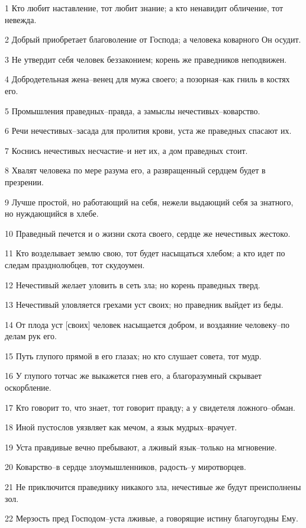 \par 1 Кто любит наставление, тот любит знание; а кто ненавидит обличение, тот невежда.
\par 2 Добрый приобретает благоволение от Господа; а человека коварного Он осудит.
\par 3 Не утвердит себя человек беззаконием; корень же праведников неподвижен.
\par 4 Добродетельная жена--венец для мужа своего; а позорная--как гниль в костях его.
\par 5 Промышления праведных--правда, а замыслы нечестивых--коварство.
\par 6 Речи нечестивых--засада для пролития крови, уста же праведных спасают их.
\par 7 Коснись нечестивых несчастие--и нет их, а дом праведных стоит.
\par 8 Хвалят человека по мере разума его, а развращенный сердцем будет в презрении.
\par 9 Лучше простой, но работающий на себя, нежели выдающий себя за знатного, но нуждающийся в хлебе.
\par 10 Праведный печется и о жизни скота своего, сердце же нечестивых жестоко.
\par 11 Кто возделывает землю свою, тот будет насыщаться хлебом; а кто идет по следам празднолюбцев, тот скудоумен.
\par 12 Нечестивый желает уловить в сеть зла; но корень праведных тверд.
\par 13 Нечестивый уловляется грехами уст своих; но праведник выйдет из беды.
\par 14 От плода уст [своих] человек насыщается добром, и воздаяние человеку--по делам рук его.
\par 15 Путь глупого прямой в его глазах; но кто слушает совета, тот мудр.
\par 16 У глупого тотчас же выкажется гнев его, а благоразумный скрывает оскорбление.
\par 17 Кто говорит то, что знает, тот говорит правду; а у свидетеля ложного--обман.
\par 18 Иной пустослов уязвляет как мечом, а язык мудрых--врачует.
\par 19 Уста правдивые вечно пребывают, а лживый язык--только на мгновение.
\par 20 Коварство--в сердце злоумышленников, радость--у миротворцев.
\par 21 Не приключится праведнику никакого зла, нечестивые же будут преисполнены зол.
\par 22 Мерзость пред Господом--уста лживые, а говорящие истину благоугодны Ему.
